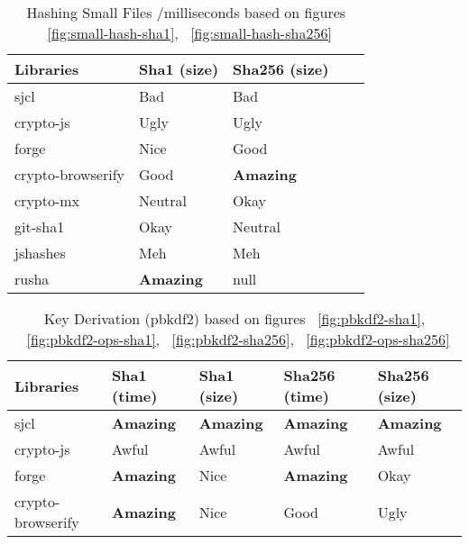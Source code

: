 \begin{table}[htpb]
\centering
\caption{Hashing Small Files /milliseconds based on figures ~\ref{fig:small-hash-sha1}, ~\ref{fig:small-hash-sha256}}
\label{tab:hashing-small-files}
\begin{adjustbox}{center, width=\columnwidth-20pt}
\begin{tabular}{|l|l|l|l|l|}
\hline
Libraries & Sha1 (size) & Sha256 (size) \\ \hline
sjcl				& Bad	& Bad		\\ \hline
crypto-js			& Ugly	& Ugly		\\ \hline
forge				& Nice	& Good		\\ \hline
crypto-browserify	& Good	& \textbf{Amazing}	\\ \hline
crypto-mx           & Neutral	& Okay			\\ \hline
git-sha1            & Okay		& Neutral		\\ \hline
jshashes            & Meh		& Meh			\\ \hline
rusha               & \textbf{Amazing}	& null	\\ \hline
\end{tabular}
\end{adjustbox}
\end{table}

\begin{table}[htpb]
\centering
\caption{Key Derivation (pbkdf2) based on figures ~\ref{fig:pbkdf2-sha1}, ~\ref{fig:pbkdf2-ops-sha1}, ~\ref{fig:pbkdf2-sha256}, ~\ref{fig:pbkdf2-ops-sha256}}
\label{tab:key-derivation-pbkdf2}
\begin{adjustbox}{center, width=\columnwidth-20pt}
\begin{tabular}{|l|l|l|l|l|}
\hline
Libraries & Sha1 (time) & Sha1 (size) & Sha256 (time) & Sha256 (size)    \\ \hline
sjcl                & \textbf{Amazing}    & \textbf{Amazing}    & \textbf{Amazing}     & \textbf{Amazing}        \\ \hline
crypto-js            & Awful    & Awful    & Awful    & Awful        \\ \hline
forge                & \textbf{Amazing}    & Nice        & \textbf{Amazing}    & Okay                \\ \hline
crypto-browserify    & \textbf{Amazing}    & Nice        & Good        & Ugly            \\ \hline
\end{tabular}
\end{adjustbox}
\end{table}

